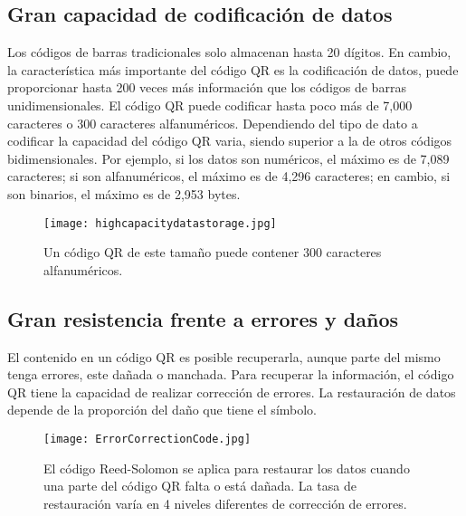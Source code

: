 \subsection{Gran capacidad de codificación de datos}
Los códigos de barras tradicionales solo almacenan hasta 20 dígitos. En cambio, la característica más importante del código QR es la codificación de datos, puede proporcionar hasta 200 veces más información que los códigos de barras unidimensionales. El código QR puede codificar hasta poco más de 7,000 caracteres o 300 caracteres alfanuméricos.\cite{2014_Chang,2012_DENSO} Dependiendo del tipo de dato a codificar la capacidad del código QR varia, siendo superior a la de otros códigos bidimensionales.   Por ejemplo, si los datos son numéricos, el máximo es de 7,089 caracteres; si son alfanuméricos, el máximo es de 4,296 caracteres; en cambio, si son binarios, el máximo es de 2,953 bytes.\cite{2012_Encinas}
\begin{figure} 
\centering
\texttt{[image: highcapacitydatastorage.jpg]}
\caption{Un código QR de este tamaño puede contener 300 caracteres alfanuméricos.}
\label{fig:datastorage}
\end{figure} 

\subsection{Gran resistencia frente a errores y daños}
El contenido en un código QR es posible recuperarla, aunque parte del mismo tenga errores, este dañada o manchada.\cite{2012_Encinas}
Para recuperar la información, el código QR tiene la capacidad de realizar corrección de errores. La restauración de datos depende de la proporción del daño que tiene el símbolo.\cite{2014_Chang}
\begin{figure} 
\centering
\texttt{[image: ErrorCorrectionCode.jpg]}
\caption{El código Reed-Solomon se aplica para restaurar los datos cuando una parte del código QR falta o está dañada. La tasa de restauración varía en 4 niveles diferentes de corrección de errores.}
\label{fig:ErrorCorrectionCode}
\end{figure} 

